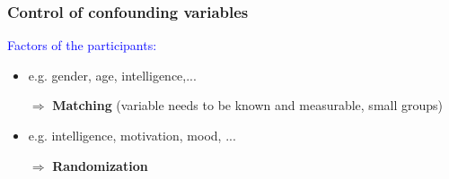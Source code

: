 \documentclass[]{beamer}
\begin{document}
\begin{frame}
\frametitle{Control of confounding variables}
\begin{overlayarea}{110mm}{80mm}
\textcolor{blue}{Factors of the participants:}
\begin{itemize}
 \item e.g. gender, age, intelligence,... 
 \item [$\Rightarrow$] \textbf{Matching} (variable needs to be known and
measurable, small groups)
 \item e.g. intelligence, motivation, mood, ... 
 \item [$\Rightarrow$] \textbf{Randomization}
\end{itemize}
\vspace{3mm}

\end{overlayarea}
\end{frame}
\end{document}
